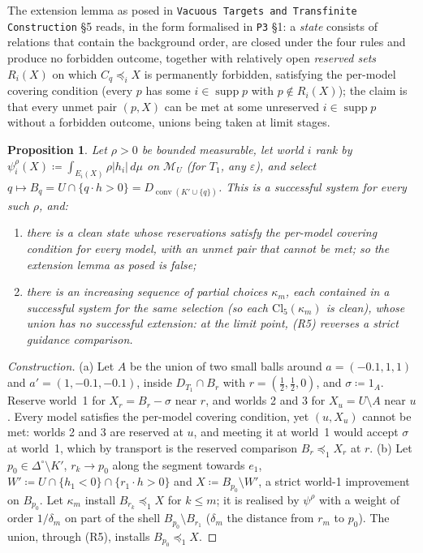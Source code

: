 \documentclass[11pt]{article}
\newtheorem{proposition}[theorem]{Proposition}
\theoremstyle{definition}
\theoremstyle{remark}
\newcommand{\Di}{\Delta^{\circ}}
\newcommand{\M}{\mathcal M}
\newcommand{\co}{\operatorname{conv}}
\newcommand{\supp}{\operatorname{supp}}
\newcommand{\src}[1]{\texttt{#1}}
\begin{document}
The extension lemma as posed in \src{Vacuous Targets and Transfinite Construction} \S5 reads, in the form formalised in \src{P3} \S1: a \emph{state} consists of relations that contain the background order, are closed under the four rules and produce no forbidden outcome, together with relatively open \emph{reserved sets} $R_i(X)$ on which $C_q\preceq_iX$ is permanently forbidden, satisfying the per-model covering condition (every $p$ has some $i\in\supp p$ with $p\notin R_i(X)$); the claim is that every unmet pair $(p,X)$ can be met at some unreserved $i\in\supp p$ without a forbidden outcome, unions being taken at limit stages.

\begin{proposition}\label{prop:extcounter}
Let $\rho>0$ be bounded measurable, let world $i$ rank by $\psi^\rho_i(X)\coloneqq\int_{E_i(X)}\rho|h_i|\,d\mu$ on $\M_U$ (for $T_1$, any $\varepsilon$), and select $q\mapsto B_q=U\cap\{q\cdot h>0\}=D_{\co(K'\cup\{q\})}$. This is a successful system for every such $\rho$, and:
\begin{enumerate}[leftmargin=*,label=(\alph*)]
\item there is a clean state whose reservations satisfy the per-model covering condition for every model, with an unmet pair that cannot be met; so the extension lemma as posed is false;
\item there is an increasing sequence of partial choices $\kappa_m$, each contained in a successful system for the same selection (so each $\mathrm{Cl}_5(\kappa_m)$ is clean), whose union has no successful extension: at the limit point, (R5) reverses a strict guidance comparison.
\end{enumerate}
\end{proposition}
\begin{proof}[Construction]
(a) Let $A$ be the union of two small balls around $a=(-0.1,1,1)$ and $a'=(1,-0.1,-0.1)$, inside $D_{T_1}\cap B_r$ with $r=(\tfrac12,\tfrac12,0)$, and $\sigma\coloneqq1_A$. Reserve world~1 for $X_r=B_r-\sigma$ near $r$, and worlds 2 and 3 for $X_u=U\setminus A$ near $u$. Every model satisfies the per-model covering condition, yet $(u,X_u)$ cannot be met: worlds 2 and 3 are reserved at $u$, and meeting it at world~1 would accept $\sigma$ at world~1, which by transport is the reserved comparison $B_r\preceq_1X_r$ at $r$. (b) Let $p_0\in\Di\setminus K'$, $r_k\to p_0$ along the segment towards $e_1$, $W'\coloneqq U\cap\{h_1<0\}\cap\{r_1\cdot h>0\}$ and $X\coloneqq B_{p_0}\setminus W'$, a strict world-1 improvement on $B_{p_0}$. Let $\kappa_m$ install $B_{r_k}\preceq_1X$ for $k\le m$; it is realised by $\psi^\rho$ with a weight of order $1/\delta_m$ on part of the shell $B_{p_0}\setminus B_{r_1}$ ($\delta_m$ the distance from $r_m$ to $p_0$). The union, through (R5), installs $B_{p_0}\preceq_1X$.
\end{proof}
\end{document}
